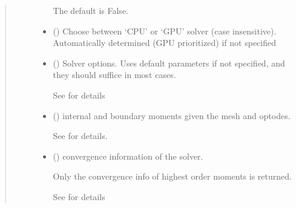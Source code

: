 \documentclass[letterpaper,10pt,english]{sphinxmanual}
\begin{document}
\begin{fulllineitems}
\begin{fulllineitems}
\begin{quote}
\begin{description}
\begin{itemize}
\sphinxAtStartPar
The default is False.


\item {} 
\sphinxAtStartPar
{} (\sphinxstyleliteralemphasis{\sphinxupquote{, }}) \textendash{} Choose between ‘CPU’ or ‘GPU’ solver (case insensitive). Automatically determined (GPU prioritized) if not specified

\item {} 
\sphinxAtStartPar
{} ({\hyperref[\detokenize{_autosummary/nirfasterff.utils.SolverOptions:nirfasterff.utils.SolverOptions}]{}}\sphinxstyleliteralemphasis{\sphinxupquote{, }}) \textendash{} 
\sphinxAtStartPar
Solver options. Uses default parameters if not specified, and they should suffice in most cases.

\sphinxAtStartPar
See {\hyperref[\detokenize{_autosummary/nirfasterff.utils.SolverOptions:nirfasterff.utils.SolverOptions}]{}} for details


\end{itemize}

\sphinxAtStartPar
\begin{itemize}
\item {} 
\sphinxAtStartPar
{} () \textendash{} internal and boundary moments given the mesh and optodes.

\sphinxAtStartPar
See {\hyperref[\detokenize{_autosummary/nirfasterff.base.data.TRMomentsdata:nirfasterff.base.data.TRMomentsdata}]{}} for details.

\item {} 
\sphinxAtStartPar
{} () \textendash{} convergence information of the solver.

\sphinxAtStartPar
Only the convergence info of highest order moments is returned.

\sphinxAtStartPar
See {\hyperref[\detokenize{_autosummary/nirfasterff.utils.ConvergenceInfo:nirfasterff.utils.ConvergenceInfo}]{}} for details


\end{itemize}
\end{description}
\end{quote}
\end{fulllineitems}
\end{fulllineitems}
\end{document}
